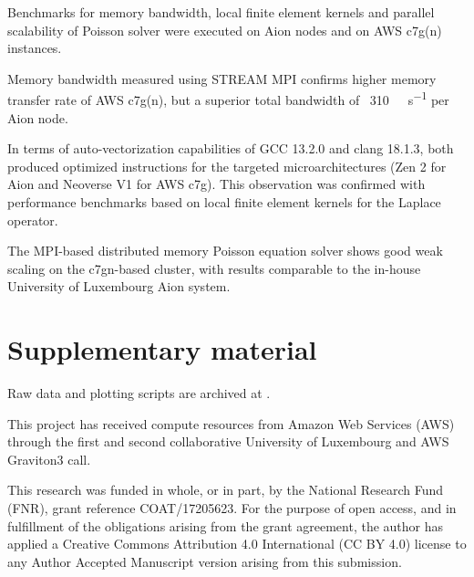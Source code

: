Benchmarks for memory bandwidth, local finite element kernels and parallel
scalability of Poisson solver were executed on Aion nodes and on AWS c7g(n)
instances.

Memory bandwidth measured using STREAM MPI confirms higher memory transfer rate
of AWS c7g(n), but a superior total bandwidth of ~\SI{310}{\giga\byte\per\second}
per Aion node.

In terms of auto-vectorization capabilities of GCC 13.2.0 and clang 18.1.3,
both produced optimized instructions for the targeted microarchitectures (Zen 2
for Aion and Neoverse V1 for AWS c7g). This observation was confirmed with
performance benchmarks based on local finite element kernels for the Laplace operator.

The MPI-based distributed memory Poisson equation solver shows good weak
scaling on the c7gn-based cluster, with results comparable to the in-house
University of Luxembourg Aion system.


\section*{Supplementary material}
Raw data and plotting scripts are archived at \citep{}.

\begin{acknowledgement}
This project has received compute resources from Amazon Web Services (AWS)
through the first and second collaborative University of Luxembourg and
AWS Graviton3 call.

This research was funded in whole, or in part, by the National Research Fund
(FNR), grant reference COAT/17205623. For the purpose of open access, and in
fulfillment of the obligations arising from the grant agreement, the author has
applied a Creative Commons Attribution 4.0 International (CC BY 4.0) license to
any Author Accepted Manuscript version arising from this submission.
\end{acknowledgement}





